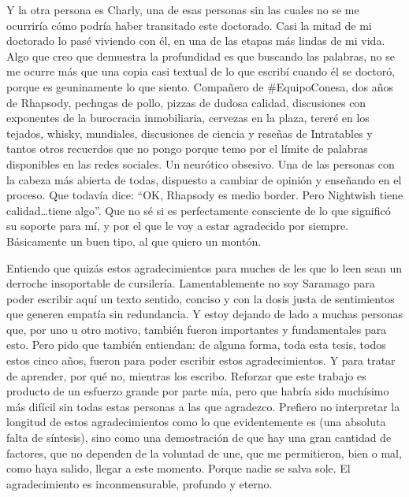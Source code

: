 Y la otra persona es Charly, una de esas personas sin las cuales no se me ocurriría cómo podría haber transitado este doctorado.
Casi la mitad de mi doctorado lo pasé viviendo con él, en una de las etapas más lindas de mi vida.
Algo que creo que demuestra la profundidad es que buscando las palabras, no se me ocurre más que una copia casi textual de lo que escribí cuando él se doctoró, porque es geuninamente lo que siento.
Compañero de \#EquipoConesa, dos años de Rhapsody, pechugas de pollo, pizzas de dudosa calidad, discusiones con exponentes de la burocracia inmobiliaria, cervezas en la plaza, tereré en los tejados, whisky, mundiales, discusiones de ciencia y reseñas de Intratables y tantos otros recuerdos que no pongo porque temo por el límite de palabras disponibles en las redes sociales.
Un neurótico obsesivo.
Una de las personas con la cabeza más abierta de todas, dispuesto a cambiar de opinión y enseñando en el proceso.
Que todavía dice: ``OK, Rhapsody es medio border. Pero Nightwish tiene calidad\ldots tiene algo''.
Que no sé si es perfectamente consciente de lo que significó su soporte para mí, y por el que le voy a estar agradecido por siempre.
Básicamente un buen tipo, al que quiero un montón.

Entiendo que quizás estos agradecimientos para muches de les que lo leen sean un derroche insoportable de cursilería.
Lamentablemente no soy Saramago para poder escribir aquí un texto sentido, conciso y con la dosis justa de sentimientos que generen empatía sin redundancia.
Y estoy dejando de lado a muchas personas que, por uno u otro motivo, también fueron importantes y fundamentales para esto.
Pero pido que también entiendan: de alguna forma, toda esta tesis, todos estos cinco años, fueron para poder escribir estos agradecimientos.
Y para tratar de aprender, por qué no, mientras los escribo.
Reforzar que este trabajo es producto de un esfuerzo grande por parte mía, pero que habría sido muchísimo más difícil sin todas estas personas a las que agradezco.
Prefiero no interpretar la longitud de estos agradecimientos como lo que evidentemente es (una absoluta falta de síntesis), sino como una demostración de que hay una gran cantidad de factores, que no dependen de la voluntad de une, que me permitieron, bien o mal, como haya salido, llegar a este momento.
Porque nadie se salva sole.
El agradecimiento es inconmensurable, profundo y eterno.